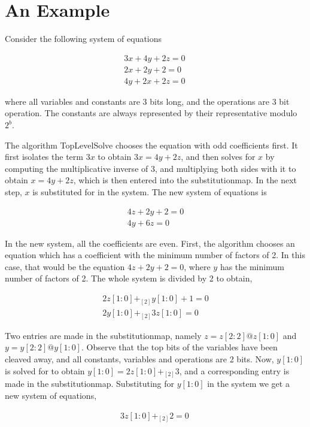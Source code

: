 \section{An Example}
Consider the following system of equations 

\begin{eqnarray}
3x + 4y + 2z = 0\nonumber\\
2x + 2y + 2 = 0\nonumber\\
4y + 2x + 2z = 0\nonumber\
\end{eqnarray}

where all variables and constants are 3 bits long, and the operations
are 3 bit operation. The constants are always represented by their
representative modulo $2^b$.

The algorithm TopLevelSolve chooses the equation with odd coefficients
first. It first isolates the term $3x$ to obtain $3x = 4y + 2z$, and
then solves for $x$ by computing the multiplicative inverse of 3, and
multiplying both sides with it to obtain $x = 4y + 2z$, which is then
entered into the substitutionmap. In the next step, $x$ is substituted
for in the system. The new system of equations is

\begin{eqnarray}
4z + 2y +2 = 0 \nonumber\\
4y + 6z = 0 \nonumber\
\end{eqnarray}

In the new system, all the coefficients are even. First, the algorithm
chooses an equation which has a coefficient with the minimum number of
factors of 2. In this case, that would be the equation $4z + 2y + 2
=0$, where $y$ has the minimum number of factors of 2. The whole
system is divided by 2 to obtain,

\begin{eqnarray}
2z[1:0] +_{[2]} y[1:0] + 1 = 0 \nonumber\\
2y[1:0] +_{[2]} 3z[1:0] = 0 \nonumber\
\end{eqnarray}

Two entries are made in the substitutionmap, namely $z=z[2:2] @
z[1:0]$ and $y=y[2:2] @ y[1:0]$. Observe that the top bits of the
variables have been cleaved away, and all constants, variables and
operations are 2 bits. Now, $y[1:0]$ is solved for to obtain $y[1:0] =
2z[1:0] +_{[2]} 3$, and a corresponding entry is made in the
substitutionmap. Substituting for $y[1:0]$ in the system we get a new
system of equations,

\begin{eqnarray}
3z[1:0] +_{[2]} 2 = 0 \nonumber\
\end{eqnarray}

